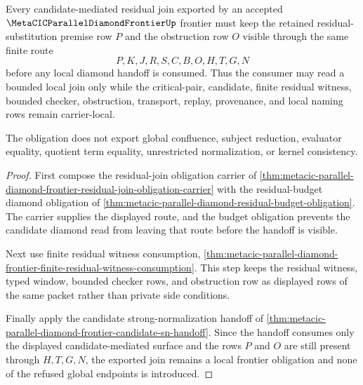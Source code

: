 \begin{theorem}
\label{thm:metacic-residual-join-frontier-obligation}
Every candidate-mediated residual join exported by an accepted $\MetaCICParallelDiamondFrontierUp$ frontier must keep the retained residual-substitution premise row $P$ and the obstruction row $O$ visible through the same finite route
$$
P,K,J,R,S,C,B,O,H,T,G,N
$$
before any local diamond handoff is consumed. Thus the consumer may read a bounded local join only while the critical-pair, candidate, finite residual witness, bounded checker, obstruction, transport, replay, provenance, and local naming rows remain carrier-local.

The obligation does not export global confluence, subject reduction, evaluator equality, quotient term equality, unrestricted normalization, or kernel consistency.
\end{theorem}
\begin{proof}
First compose the residual-join obligation carrier of \autoref{thm:metacic-parallel-diamond-frontier-residual-join-obligation-carrier} with the residual-budget diamond obligation of \autoref{thm:metacic-parallel-diamond-residual-budget-obligation}. The carrier supplies the displayed route, and the budget obligation prevents the candidate diamond read from leaving that route before the handoff is visible.

Next use finite residual witness consumption, \autoref{thm:metacic-parallel-diamond-frontier-finite-residual-witness-consumption}. This step keeps the residual witness, typed window, bounded checker rows, and obstruction row as displayed rows of the same packet rather than private side conditions.

Finally apply the candidate strong-normalization handoff of \autoref{thm:metacic-parallel-diamond-frontier-candidate-sn-handoff}. Since the handoff consumes only the displayed candidate-mediated surface and the rows $P$ and $O$ are still present through $H,T,G,N$, the exported join remains a local frontier obligation and none of the refused global endpoints is introduced.
\end{proof}

